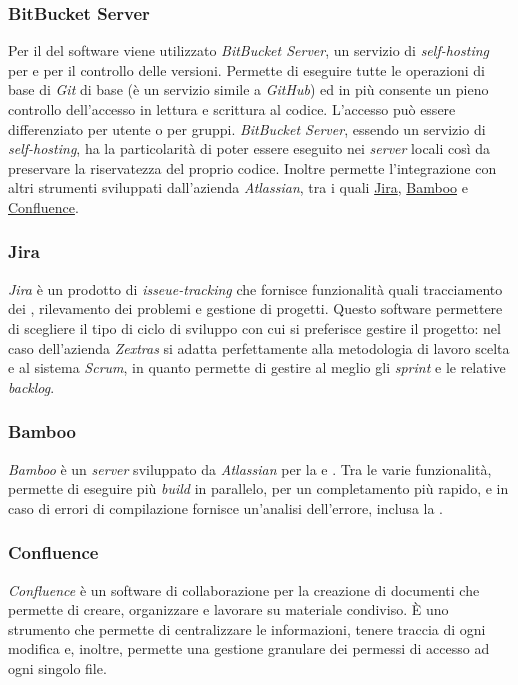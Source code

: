 \subsubsection{BitBucket Server}
Per il  del software viene utilizzato \emph{BitBucket Server}, un servizio di \emph{self-hosting} per   e per il controllo delle versioni. Permette di eseguire tutte le operazioni di base di \emph{Git} di base (è un servizio simile a \emph{GitHub}) ed in più consente un pieno controllo dell'accesso in lettura e scrittura al codice. L'accesso può essere differenziato per utente o per gruppi. \emph{BitBucket Server}, essendo un servizio di \emph{self-hosting}, ha la particolarità di poter essere eseguito nei \emph{server} locali così da preservare la riservatezza del proprio codice. Inoltre permette l'integrazione con altri strumenti sviluppati dall'azienda \emph{Atlassian}, tra i quali \hyperref[subsubsec:jira]{Jira}, \hyperref[subsubsec:bamboo]{Bamboo} e \hyperref[subsubsec:confluence]{Confluence}.
\subsubsection{Jira}\label{subsubsec:jira}
\emph{Jira} è un prodotto di \emph{isseue-tracking} che fornisce funzionalità quali tracciamento dei , rilevamento dei problemi e gestione di progetti. Questo software permettere di scegliere il tipo di ciclo di sviluppo con cui si preferisce gestire il progetto: nel caso dell'azienda \emph{Zextras} si adatta perfettamente alla metodologia di lavoro scelta e al sistema \emph{Scrum}, in quanto permette di gestire al meglio gli \emph{sprint} e le relative \emph{backlog}.
\subsubsection{Bamboo}\label{subsubsec:bamboo}
\emph{Bamboo} è un \emph{server} sviluppato da \emph{Atlassian} per la  e . Tra le varie funzionalità, permette di eseguire più \emph{build} in parallelo, per un completamento più rapido, e in caso di errori di compilazione fornisce un'analisi dell'errore, inclusa la .
\subsubsection{Confluence}\label{subsubsec:confluence}
\emph{Confluence} è un software di collaborazione per la creazione di documenti che permette di creare, organizzare e lavorare su materiale condiviso. È uno strumento che permette di centralizzare le informazioni, tenere traccia di ogni modifica e, inoltre, permette una gestione granulare dei permessi di accesso ad ogni singolo file.

